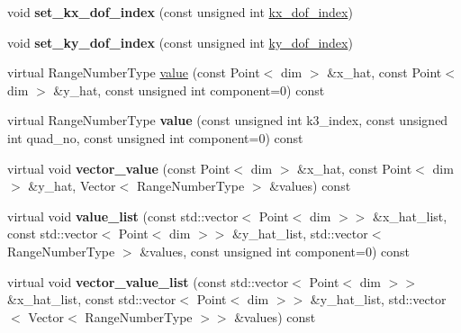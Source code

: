 \begin{DoxyCompactItemize}
\item 
\mbox{\label{classLaplaceBEM_1_1KernelPulledbackToUnitCell_a1067e884c01a2f6d4648f9fc08fc2bc2}} 
void {\bfseries set\+\_\+kx\+\_\+dof\+\_\+index} (const unsigned int \hyperlink{classLaplaceBEM_1_1KernelPulledbackToUnitCell_a66ba57ad86025978e5e5580c822aef89}{kx\+\_\+dof\+\_\+index})
\item 
\mbox{\label{classLaplaceBEM_1_1KernelPulledbackToUnitCell_a39ea676a505803290a647c99699b5504}} 
void {\bfseries set\+\_\+ky\+\_\+dof\+\_\+index} (const unsigned int \hyperlink{classLaplaceBEM_1_1KernelPulledbackToUnitCell_ae6f3e4bc6cf09546bf11d01812f9b692}{ky\+\_\+dof\+\_\+index})
\item 
virtual Range\+Number\+Type \hyperlink{classLaplaceBEM_1_1KernelPulledbackToUnitCell_ac55bd556acba999c6d71c322eff33cd9}{value} (const Point$<$ dim $>$ \&x\+\_\+hat, const Point$<$ dim $>$ \&y\+\_\+hat, const unsigned int component=0) const
\item 
\mbox{\label{classLaplaceBEM_1_1KernelPulledbackToUnitCell_a6e75380f10acb10bf08e13e224555b5e}} 
virtual Range\+Number\+Type {\bfseries value} (const unsigned int k3\+\_\+index, const unsigned int quad\+\_\+no, const unsigned int component=0) const
\item 
\mbox{\label{classLaplaceBEM_1_1KernelPulledbackToUnitCell_a4d437adc317f62574a4ba455d7ec90eb}} 
virtual void {\bfseries vector\+\_\+value} (const Point$<$ dim $>$ \&x\+\_\+hat, const Point$<$ dim $>$ \&y\+\_\+hat, Vector$<$ Range\+Number\+Type $>$ \&values) const
\item 
\mbox{\label{classLaplaceBEM_1_1KernelPulledbackToUnitCell_ad38a736de2a0429e1db389f7b12d2965}} 
virtual void {\bfseries value\+\_\+list} (const std\+::vector$<$ Point$<$ dim $>$$>$ \&x\+\_\+hat\+\_\+list, const std\+::vector$<$ Point$<$ dim $>$$>$ \&y\+\_\+hat\+\_\+list, std\+::vector$<$ Range\+Number\+Type $>$ \&values, const unsigned int component=0) const
\item 
\mbox{\label{classLaplaceBEM_1_1KernelPulledbackToUnitCell_a4f989a914e21298f3e2dd9da7fd6f4f6}} 
virtual void {\bfseries vector\+\_\+value\+\_\+list} (const std\+::vector$<$ Point$<$ dim $>$$>$ \&x\+\_\+hat\+\_\+list, const std\+::vector$<$ Point$<$ dim $>$$>$ \&y\+\_\+hat\+\_\+list, std\+::vector$<$ Vector$<$ Range\+Number\+Type $>$$>$ \&values) const
\end{DoxyCompactItemize}
